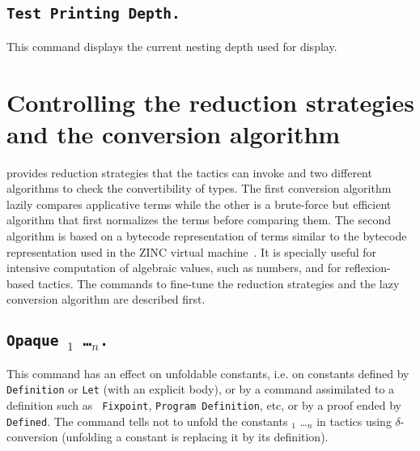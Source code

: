 \subsection[\tt Test Printing Depth.]{\tt Test Printing Depth.}
This command displays the current nesting depth used for display.




\section{Controlling the reduction strategies and the conversion algorithm}
\label{Controlling reduction strategy}

{\Coq} provides reduction strategies that the tactics can invoke and
two different algorithms to check the convertibility of types.
The first conversion algorithm lazily
compares applicative terms while the other is a brute-force but efficient
algorithm that first normalizes the terms before comparing them.  The
second algorithm is based on a bytecode representation of terms
similar to the bytecode representation used in the ZINC virtual
machine~\cite{Leroy90}. It is specially useful for intensive
computation of algebraic values, such as numbers, and for reflexion-based
tactics. The commands to fine-tune the reduction strategies and the
lazy conversion algorithm are described first.

\subsection[\tt Opaque \qualid$_1$ \dots \qualid$_n$.]{\tt Opaque \qualid$_1$ \dots \qualid$_n$.\label{Opaque}} 
This command has an effect on unfoldable constants, i.e. 
on constants defined by {\tt Definition} or {\tt Let} (with an explicit
body), or by a command assimilated to a definition such as {\tt
Fixpoint}, {\tt Program Definition}, etc, or by a proof ended by {\tt
Defined}. The command tells not to unfold
the constants {\qualid$_1$} \dots {\qualid$_n$} in tactics using
$\delta$-conversion (unfolding a constant is replacing it by its
definition).

